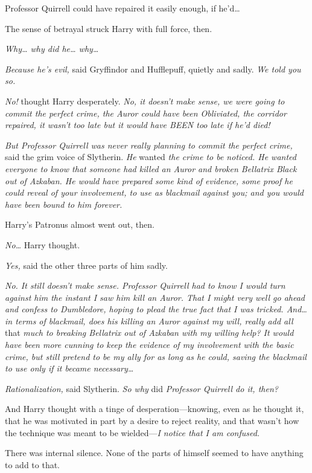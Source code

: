 Professor Quirrell could have repaired it easily enough, if he'd\ldots{}

The sense of betrayal struck Harry with full force, then.

\emph{Why\ldots{} why did he\ldots{} why\ldots{}}

\emph{Because he's evil,} said Gryffindor and Hufflepuff, quietly and
sadly. \emph{We told you so.}

\emph{No!} thought Harry desperately. \emph{No, it doesn't make sense,
we were going to commit the perfect crime, the Auror could have been
Obliviated, the corridor repaired, it wasn't too late but it would have
BEEN too late if he'd died!}

\emph{But Professor Quirrell was never really planning to commit the
perfect crime,} said the grim voice of Slytherin. \emph{He} wanted
\emph{the crime to be noticed. He wanted everyone to know that someone
had killed an Auror and broken Bellatrix Black out of Azkaban. He would
have prepared some kind of evidence, some proof he could reveal of your
involvement, to use as blackmail against you; and you would have been
bound to him forever.}

Harry's Patronus almost went out, then.

\emph{No\ldots{}} Harry thought.

\emph{Yes,} said the other three parts of him sadly.

\emph{No. It still doesn't make sense. Professor Quirrell had to know I
would turn against him the instant I saw him kill an Auror. That I might
very well go ahead and confess to Dumbledore, hoping to plead the true
fact that I was tricked. And\ldots{} in terms of blackmail, does his
killing an Auror against my will, really add all} that \emph{much to
breaking Bellatrix out of Azkaban with my willing help? It would have
been more cunning to keep the evidence of my involvement with the basic
crime, but still pretend to be my ally for as long as he could, saving
the blackmail to use only if it became necessary\ldots{}}

\emph{Rationalization,} said Slytherin. \emph{So why} did
\emph{Professor Quirrell do it, then?}

And Harry thought with a tinge of desperation---knowing, even as he
thought it, that he was motivated in part by a desire to reject reality,
and that wasn't how the technique was meant to be wielded---\emph{I
notice that I am confused.}

There was internal silence. None of the parts of himself seemed to have
anything to add to that.

